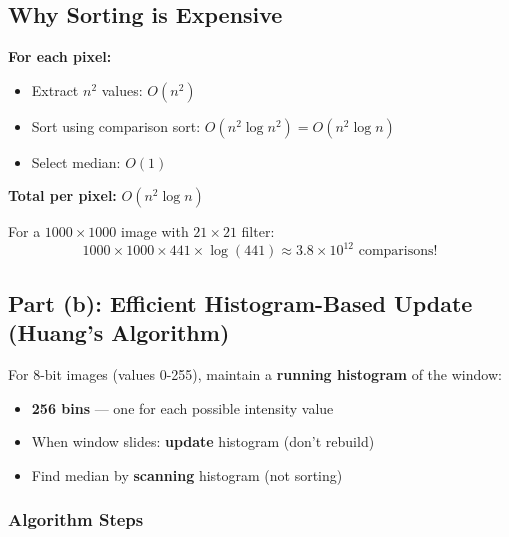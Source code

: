\documentclass[12pt,a4paper]{article}
\begin{document}
\subsection{Why Sorting is Expensive}

\begin{conceptbox}
\textbf{For each pixel:}
\begin{itemize}
    \item Extract $n^2$ values: $O(n^2)$
    \item Sort using comparison sort: $O(n^2 \log n^2) = O(n^2 \log n)$
    \item Select median: $O(1)$
\end{itemize}

\textbf{Total per pixel:} $O(n^2 \log n)$

For a $1000 \times 1000$ image with $21 \times 21$ filter:
\[
1000 \times 1000 \times 441 \times \log(441) \approx 3.8 \times 10^{12} \text{ comparisons!}
\]
\end{conceptbox}

\subsection{Part (b): Efficient Histogram-Based Update (Huang's Algorithm)}

\begin{conceptbox}
For 8-bit images (values 0-255), maintain a \textbf{running histogram} of the window:
\begin{itemize}
    \item \textbf{256 bins} --- one for each possible intensity value
    \item When window slides: \textbf{update} histogram (don't rebuild)
    \item Find median by \textbf{scanning} histogram (not sorting)
\end{itemize}
\end{conceptbox}

\subsubsection{Algorithm Steps}
\end{document}
